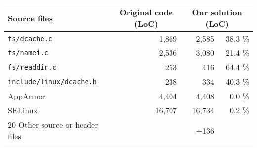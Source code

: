 \begin{table}[t]
\scriptsize
\centering
\begin{tabular}{|p{1.3in}|r|rr|}
\hline
Source files & \multicolumn{1}{c|}{Original code (LoC)} & \multicolumn{2}{c|}{Our solution (LoC)} \\
\hline
{\tt fs/dcache.c} & 1,869 & 2,585 & 38.3 \% \\
\hline
{\tt fs/namei.c} & 2,536 & 3,080 & 21.4 \% \\
\hline
{\tt fs/readdir.c} & 253 & 416 & 64.4 \% \\
\hline
{\tt include/linux/dcache.h} & 238 & 334 & 40.3 \% \\
\hline
AppArmor & 4,404 & 4,408 & 0.0 \% \\
\hline
SELinux & 16,707 & 16,734 & 0.2 \% \\
\hline
20 Other source or header files &  & +136 &  \\

\end{tabular}
\end{table}
